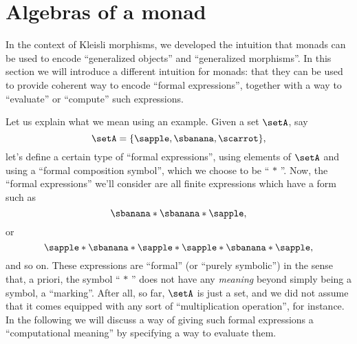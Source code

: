 
\section{Algebras of a monad}
\label{sec:Eilenberg-Moore}



In the context of Kleisli morphisms, we developed the intuition that monads can be used to encode ``generalized objects'' and ``generalized morphisms''.
In this section we will introduce a different intuition for monads: that they can be used to provide coherent way to encode ``formal expressions'', together with a way to ``evaluate'' or ``compute'' such expressions.

Let us explain what we mean using an example.
Given a set $\setA$, say
\begin{equation}
	\setA = \{ \sapple, \sbanana, \scarrot \},
\end{equation}
let's define a certain type of ``formal expressions'', using elements of $\setA$ and using a ``formal composition symbol'', which we choose to be `` $*$ ''.
Now, the ``formal expressions'' we'll consider are all finite expressions which have a form such as
\begin{equation}
	\label{eq:formal-composition-1}
	\sbanana * \sbanana * \sapple,
\end{equation}
or
\begin{equation}
	\label{eq:formal-composition-2}
	\sapple * \sbanana * \sapple * \sapple * \sbanana * \sapple,
\end{equation}
and so on.
These expressions are ``formal'' (or ``purely symbolic'') in the sense that, a priori, the symbol `` $*$ '' does not have any \emph{meaning} beyond simply being a symbol, a ``marking''.
After all, so far, $\setA$ is just a set, and we did not assume that it comes equipped with any sort of ``multiplication operation'', for instance.
In the following we will discuss a way of giving such formal expressions a ``computational meaning'' by specifying a way to evaluate them.

